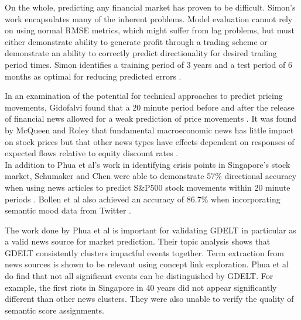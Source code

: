 On the whole, predicting any financial market has proven to be difficult. Simon's work encapsulates many of the inherent problems. Model evaluation cannot rely on using normal RMSE metrics, which might suffer from lag problems, but must either demonstrate ability to generate profit through a trading scheme or demonstrate an ability to correctly predict directionality for desired trading period times. Simon identifies a training period of 3 years and a test period of 6 months as optimal for reducing predicted errors \cite{forex_neuralnets}.

\noindent In an examination of the potential for technical approaches to predict pricing movements, Gidofalvi found that a 20 minute period before and after the release of financial news allowed for a weak prediction of price movements \cite{gidofalvi2001using}. It was found by McQueen and Roley that fundamental macroeconomic news has little impact on stock prices but that other news types have effects dependent on responses of expected flows relative to equity discount rates \cite{mcqueen1993stock}.\\

\noindent In addition to Phua et al's work in identifying crisis points in Singapore's stock market, Schumaker and Chen were able to demonstrate 57\% directional accuracy when using news articles to predict S\&P500 stock movements within 20 minute periods \cite{schumaker2009textual}. Bollen et al also achieved an accuracy of 86.7\% when incorporating semantic mood data from Twitter \cite{bollen2011twitter}.

\noindent The work done by Phua et al is important for validating GDELT in particular as a valid news source for market prediction. Their topic analysis shows that GDELT consistently clusters impactful events together. Term extraction from news sources is shown to be relevant using concept link exploration. Phua et al do find that not all significant events can be distinguished by GDELT. For example, the first riots in Singapore in 40 years did not appear significantly different than other news clusters. They were also unable to verify the quality of semantic score assignments.